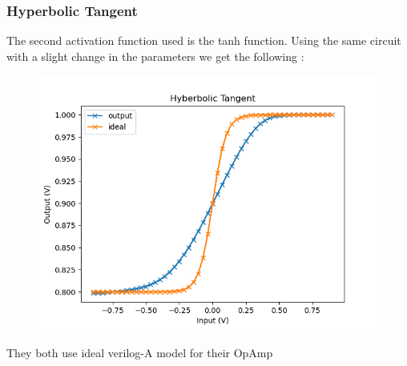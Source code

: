 \documentclass{beamer}
\begin{document}
\begin{frame}
  \frametitle{Hyperbolic Tangent}
  The second activation function used is the tanh function. Using the same circuit with a slight change in the parameters we get the following :
  \begin{figure}
    \centering
    \includegraphics[height=0.5\textheight]{figures/tanh.png}
  \end{figure}
  They both use ideal verilog-A model for their OpAmp
\end{frame}
\end{document}
